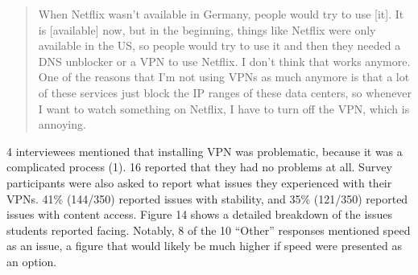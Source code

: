 \begin{quote}When Netflix wasn't available in Germany, people would try to use [it]. It is [available] now, but in the beginning, things like Netflix were
only available in the US, so people would try to use it and then they needed a
DNS unblocker or a VPN to use Netflix. I don't think that works anymore. One
of the reasons that I'm not using VPNs as much anymore is that a lot of these
services just block the IP ranges of these data centers, so whenever I want to
watch something on Netflix, I have to turn off the VPN, which is annoying.
\end{quote}

4 interviewees mentioned that installing VPN was problematic, because it was a
complicated process (1). 16 reported that they had no problems at all. Survey participants were also asked to report what issues they experienced with
their VPNs. 41\% (144/350) reported issues with stability, and 35\% (121/350)
reported issues with content access. Figure 14 shows a detailed breakdown of
the issues students reported facing. Notably, 8 of the 10 “Other” responses
mentioned speed as an issue, a figure that would likely be much higher if
speed were presented as an option.
